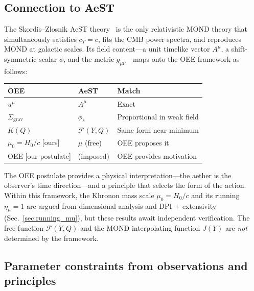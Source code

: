\documentclass[prd,twocolumn,superscriptaddress,longbibliography,floatfix]{revtex4-2}
\newcommand{\Sgrav}{\Sigma_{\mathrm{grav}}}
\begin{document}
\subsection{Connection to AeST}

The Skordis--Zlosnik AeST theory~\cite{SkordisZlosnik2021}
is the only relativistic MOND theory that simultaneously
satisfies $c_T = c$, fits the CMB power spectra, and
reproduces MOND at galactic scales.  Its field content---a
unit timelike vector $A^\mu$, a shift-symmetric scalar
$\phi$, and the metric $g_{\mu\nu}$---maps onto the
OEE framework as follows:
\begin{center}
\begin{tabular}{lll}
\textbf{OEE} & \textbf{AeST} & \textbf{Match} \\
\hline
$u^\mu$ & $A^\mu$ & Exact \\
$\Sgrav$ & $\phi_s$ & Proportional in weak field \\
$K(Q)$ & $\mathcal{F}(Y,Q)$ & Same form near minimum \\
$\mu_0 = H_0/c$ [ours] & $\mu$ (free) & OEE proposes it \\
OEE [our postulate] & (imposed) & OEE provides motivation \\
\end{tabular}
\end{center}

The OEE postulate provides a physical interpretation---the
aether is the observer's time direction---and a principle
that selects the form of the action.  Within this
framework, the Khronon mass scale $\mu_0 = H_0/c$ and
its running $\eta_\mu = 1$ are argued from dimensional
analysis and DPI $+$ extensivity
(Sec.~\ref{sec:running_mu}), but these results await
independent verification.  The free function
$\mathcal{F}(Y,Q)$ and the MOND interpolating function
$J(Y)$ are \emph{not} determined by the framework.

\subsection{Parameter constraints from observations and principles}
\end{document}
